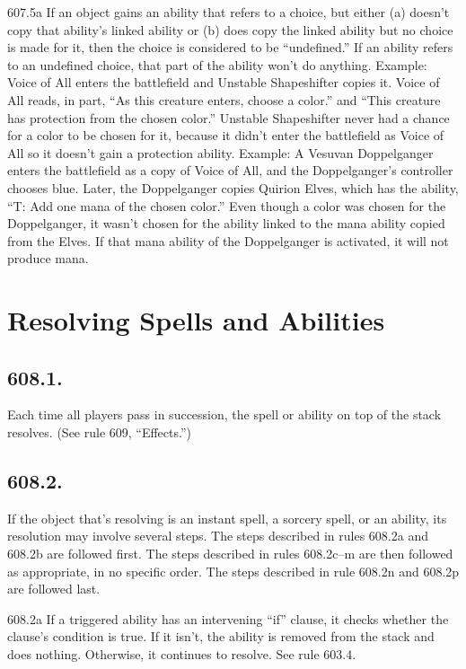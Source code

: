607.5a If an object gains an ability that refers to a choice, but either (a) doesn’t copy that ability’s linked ability or (b) does copy the linked ability but no choice is made for it, then the choice is considered to be “undefined.” If an ability refers to an undefined choice, that part of the ability won’t do anything.
Example: Voice of All enters the battlefield and Unstable Shapeshifter copies it. Voice of All reads, in part, “As this creature enters, choose a color.” and “This creature has protection from the chosen color.” Unstable Shapeshifter never had a chance for a color to be chosen for it, because it didn’t enter the battlefield as Voice of All so it doesn’t gain a protection ability.
Example: A Vesuvan Doppelganger enters the battlefield as a copy of Voice of All, and the Doppelganger’s controller chooses blue. Later, the Doppelganger copies Quirion Elves, which has the ability, “{T}: Add one mana of the chosen color.” Even though a color was chosen for the Doppelganger, it wasn’t chosen for the ability linked to the mana ability copied from the Elves. If that mana ability of the Doppelganger is activated, it will not produce mana.

\section{Resolving Spells and Abilities}
\subsection*{608.1.}
Each time all players pass in succession, the spell or ability on top of the stack resolves. (See rule 609, “Effects.”)

\subsection*{608.2.}
If the object that’s resolving is an instant spell, a sorcery spell, or an ability, its resolution may involve several steps. The steps described in rules 608.2a and 608.2b are followed first. The steps described in rules 608.2c–m are then followed as appropriate, in no specific order. The steps described in rule 608.2n and 608.2p are followed last.

608.2a If a triggered ability has an intervening “if” clause, it checks whether the clause’s condition is true. If it isn’t, the ability is removed from the stack and does nothing. Otherwise, it continues to resolve. See rule 603.4.

